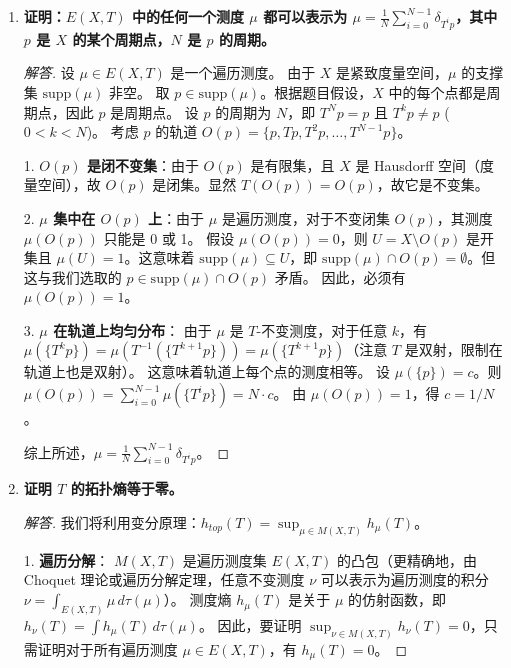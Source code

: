 \documentclass[a4paper,12pt]{article}
\newenvironment{solution}{\begin{proof}[解答]}{\end{proof}}
\begin{document}
\begin{enumerate}
    \item \textbf{证明：$E(X, T)$ 中的任何一个测度 $\mu$ 都可以表示为 $\mu = \frac{1}{N} \sum_{i=0}^{N-1} \delta_{T^i p}$，其中 $p$ 是 $X$ 的某个周期点，$N$ 是 $p$ 的周期。}
    
    \begin{solution}
        设 $\mu \in E(X, T)$ 是一个遍历测度。
        由于 $X$ 是紧致度量空间，$\mu$ 的支撑集 $\text{supp}(\mu)$ 非空。
        取 $p \in \text{supp}(\mu)$。根据题目假设，$X$ 中的每个点都是周期点，因此 $p$ 是周期点。
        设 $p$ 的周期为 $N$，即 $T^N p = p$ 且 $T^k p \neq p$ ($0 < k < N$)。
        考虑 $p$ 的轨道 $O(p) = \{p, Tp, T^2p, \dots, T^{N-1}p\}$。
        
        1. \textbf{$O(p)$ 是闭不变集}：由于 $O(p)$ 是有限集，且 $X$ 是 Hausdorff 空间（度量空间），故 $O(p)$ 是闭集。显然 $T(O(p)) = O(p)$，故它是不变集。
        
        2. \textbf{$\mu$ 集中在 $O(p)$ 上}：由于 $\mu$ 是遍历测度，对于不变闭集 $O(p)$，其测度 $\mu(O(p))$ 只能是 0 或 1。
        假设 $\mu(O(p)) = 0$，则 $U = X \setminus O(p)$ 是开集且 $\mu(U) = 1$。这意味着 $\text{supp}(\mu) \subseteq U$，即 $\text{supp}(\mu) \cap O(p) = \emptyset$。但这与我们选取的 $p \in \text{supp}(\mu) \cap O(p)$ 矛盾。
        因此，必须有 $\mu(O(p)) = 1$。
        
        3. \textbf{$\mu$ 在轨道上均匀分布}：
        由于 $\mu$ 是 $T$-不变测度，对于任意 $k$，有 $\mu(\{T^k p\}) = \mu(T^{-1}(\{T^{k+1} p\})) = \mu(\{T^{k+1} p\})$（注意 $T$ 是双射，限制在轨道上也是双射）。
        这意味着轨道上每个点的测度相等。
        设 $\mu(\{p\}) = c$。则 $\mu(O(p)) = \sum_{i=0}^{N-1} \mu(\{T^i p\}) = N \cdot c$。
        由 $\mu(O(p)) = 1$，得 $c = 1/N$。
        
        综上所述，$\mu = \frac{1}{N} \sum_{i=0}^{N-1} \delta_{T^i p}$。
    \end{solution}

    \item \textbf{证明 $T$ 的拓扑熵等于零。}
    
    \begin{solution}
        我们将利用变分原理：$h_{top}(T) = \sup_{\mu \in M(X, T)} h_\mu(T)$。
        
        1. \textbf{遍历分解}：
        $M(X, T)$ 是遍历测度集 $E(X, T)$ 的凸包（更精确地，由 Choquet 理论或遍历分解定理，任意不变测度 $\nu$ 可以表示为遍历测度的积分 $\nu = \int_{E(X, T)} \mu \, d\tau(\mu)$）。
        测度熵 $h_\mu(T)$ 是关于 $\mu$ 的仿射函数，即 $h_\nu(T) = \int h_\mu(T) \, d\tau(\mu)$。
        因此，要证明 $\sup_{\nu \in M(X, T)} h_\nu(T) = 0$，只需证明对于所有遍历测度 $\mu \in E(X, T)$，有 $h_\mu(T) = 0$。
        

\end{solution}
\end{enumerate}
\end{document}
